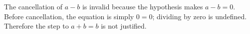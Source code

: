 The cancellation of $a-b$ is invalid because the hypothesis makes $a-b=0$. Before cancellation, the equation is simply $0=0$; dividing by zero is undefined. Therefore the step to $a+b=b$ is not justified.
